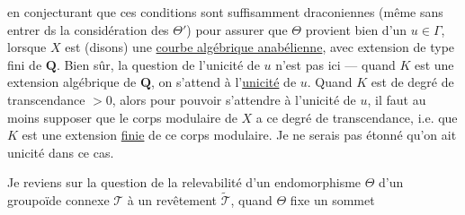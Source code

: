 en conjecturant que ces conditions  sont suffisamment draconiennes  (même sans entrer ds la considération des $\Theta'$) pour assurer que $\Theta$ provient bien d'un $u\in\Gamma$,  lorsque $X$ est (disons) une \uline{courbe algébrique anabélienne}, avec extension de type fini de $\mathbf{Q}$.
Bien sûr, la question de l'unicité de $u$ n'est pas  ici --- quand $K$ est une extension algébrique de $\mathbf{Q}$, on s'attend à l'\uline{unicité} de $u$. Quand $K$ est de degré de transcendance $>0$, alors pour pouvoir s'attendre à l'unicité de $u$, il faut au moins supposer que le corps modulaire de $X$ a ce degré de transcendance, i.e. que $K$ est une extension \uline{finie} de ce corps modulaire. Je ne serais pas étonné qu'on ait unicité dans ce cas.

Je reviens sur la question de la relevabilité d'un \deleted{$\unsure{\Theta}$} endomorphisme $\Theta$ d'un groupoïde connexe $\mathcal{T}$ à un revêtement $\widetilde{\mathcal{T}}$, quand $\Theta$ fixe un sommet

